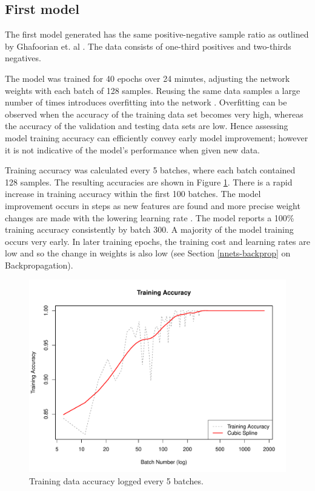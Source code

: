 \subsection*{First model}

The first model generated has the same positive-negative sample ratio as outlined by Ghafoorian et. al \cite{GhafoorianM.2017Dml3}. The data consists of one-third positives and two-thirds negatives.

The model was trained for 40 epochs over 24 minutes, adjusting the network weights with each batch of 128 samples. Reusing the same data samples a large number of times introduces overfitting into the network \cite{Goodfellow-et-al-2016}. Overfitting can be observed when the accuracy of the training data set becomes very high, whereas the accuracy of the validation and testing data sets are low. Hence assessing model training accuracy can efficiently convey early model improvement; however it is not indicative of the model's performance when given new data.

Training accuracy was calculated every 5 batches, where each batch contained 128 samples. The resulting accuracies are shown in Figure \ref{results-train-acc4-fig}. There is a rapid increase in training accuracy within the first 100 batches. The model improvement occurs in steps as new features are found and more precise weight changes are made with the lowering learning rate \citep{Folly2009, Nielson2015}. The model reports a 100\% training accuracy consistently by batch 300. A majority of the model training occurs very early. In later training epochs, the training cost and learning rates are low and so the change in weights is also low (see Section \ref{nnets-backprop} on Backpropagation).

\begin{figure}[hb]
	\centering
	\includegraphics[width=\textwidth]{Images/7_train_acc4.pdf}
	\caption{Training data accuracy logged every 5 batches.}
	\label{results-train-acc4-fig}
\end{figure}

